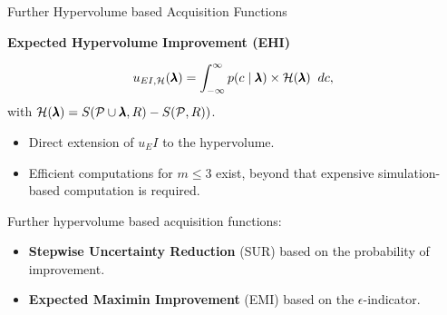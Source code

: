 \begin{frame}{Further Hypervolume based Acquisition Functions}

    \textbf{Expected Hypervolume Improvement (EHI)}

$$
    u_{EI, \mathcal{H}}(\pmb{\lambda}) = \int_{-\infty}^{\infty} p(c \mid \pmb{\lambda}) \times \mathcal{H}(\pmb{\lambda})\;\; dc,\
$$
    with $\mathcal{H}(\pmb{\lambda}) = S(\mathcal{P} \cup \pmb{\lambda}, R) - S(\mathcal{P}, R))$.

    \begin{itemize}
        \item Direct extension of $u_EI$ to the hypervolume.
        \item Efficient computations for $m \le 3$ exist, beyond that expensive simulation-based computation is required.
    \end{itemize}


    \vspace{0.5cm}
Further hypervolume based acquisition functions:

    \begin{itemize}
        \item \textbf{Stepwise Uncertainty Reduction} (SUR) based on the probability of improvement.
        \item \textbf{Expected Maximin Improvement} (EMI) based on the $\epsilon$-indicator.
    \end{itemize}


\end{frame}

